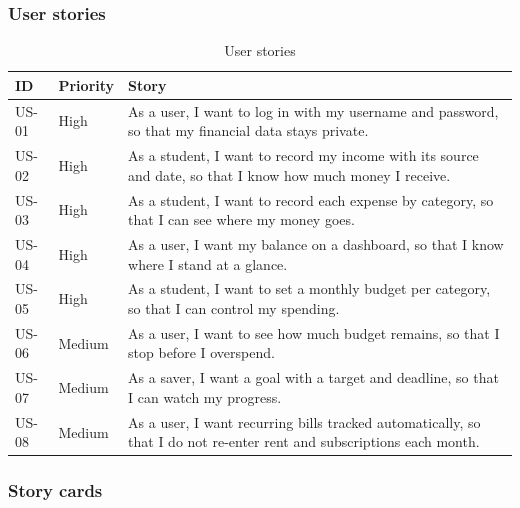 \documentclass[12pt,a4paper]{article}
\begin{document}
\subsubsection{User stories}
\begin{table}[H]
\centering
\caption{User stories}
\begin{tabularx}{\textwidth}{@{}llX@{}}
  \toprule
  \textbf{ID} & \textbf{Priority} & \textbf{Story}\\
  \midrule
  US-01 & High & As a user, I want to log in with my username and password, so that my financial data stays private.\\
  US-02 & High & As a student, I want to record my income with its source and date, so that I know how much money I receive.\\
  US-03 & High & As a student, I want to record each expense by category, so that I can see where my money goes.\\
  US-04 & High & As a user, I want my balance on a dashboard, so that I know where I stand at a glance.\\
  US-05 & High & As a student, I want to set a monthly budget per category, so that I can control my spending.\\
  US-06 & Medium & As a user, I want to see how much budget remains, so that I stop before I overspend.\\
  US-07 & Medium & As a saver, I want a goal with a target and deadline, so that I can watch my progress.\\
  US-08 & Medium & As a user, I want recurring bills tracked automatically, so that I do not re-enter rent and subscriptions each month.\\
  \bottomrule
\end{tabularx}
\end{table}

\subsubsection{Story cards}
\newcommand{\storycard}[4]{%
  \begin{table}[H]
  \centering
  \caption{#1}
  \begin{tabularx}{\textwidth}{@{}>{\bfseries}p{3.2cm}X@{}}
    \toprule
    Story & #2 \\
    Priority & #3 \\
    \midrule
    Acceptance criteria & \begin{itemize}#4\end{itemize} \\
    \bottomrule
  \end{tabularx}
  \end{table}}
\end{document}
